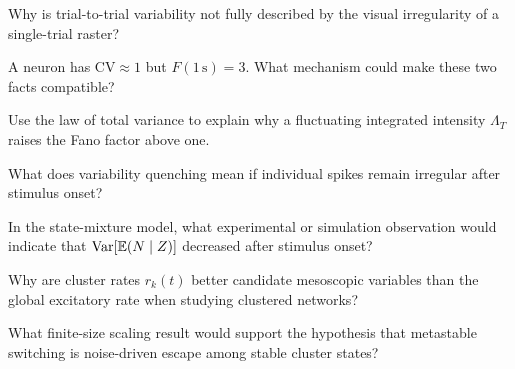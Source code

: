 \begin{conceptquestions}
  \item Why is trial-to-trial variability not fully described by the visual irregularity of a single-trial raster?
  \item A neuron has $\mathrm{CV}\approx 1$ but $F(1\,\mathrm{s})=3$. What mechanism could make these two facts compatible?
  \item Use the law of total variance to explain why a fluctuating integrated intensity $\Lambda_T$ raises the Fano factor above one.
  \item What does variability quenching mean if individual spikes remain irregular after stimulus onset?
  \item In the state-mixture model, what experimental or simulation observation would indicate that $\operatorname{Var}[\mathbb{E}(N\mid Z)]$ decreased after stimulus onset?
  \item Why are cluster rates $r_k(t)$ better candidate mesoscopic variables than the global excitatory rate when studying clustered networks?
  \item What finite-size scaling result would support the hypothesis that metastable switching is noise-driven escape among stable cluster states?
\end{conceptquestions}

\clearpage
